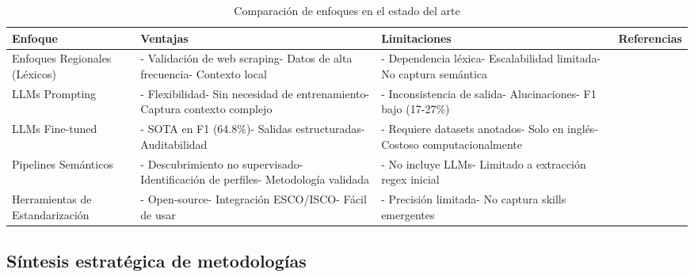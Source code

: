 \begin{table}[H]
\centering
\caption{Comparación de enfoques en el estado del arte}
\label{tab:estado-arte-comparativo}
\begin{tabular}{|p{3cm}|p{4cm}|p{4cm}|p{3cm}|}
\hline
\textbf{Enfoque} & \textbf{Ventajas} & \textbf{Limitaciones} & \textbf{Referencias} \\
\hline
Enfoques Regionales (Léxicos) & - Validación de web scraping\newline - Datos de alta frecuencia\newline - Contexto local & - Dependencia léxica\newline - Escalabilidad limitada\newline - No captura semántica & \cite{rubio2024, aguilera2018, martinez2024} \\
\hline
LLMs Prompting & - Flexibilidad\newline - Sin necesidad de entrenamiento\newline - Captura contexto complejo & - Inconsistencia de salida\newline - Alucinaciones\newline - F1 bajo (17-27\%) & \cite{nguyen2024} \\
\hline
LLMs Fine-tuned & - SOTA en F1 (64.8\%)\newline - Salidas estructuradas\newline - Auditabilidad & - Requiere datasets anotados\newline - Solo en inglés\newline - Costoso computacionalmente & \cite{herandi2024, zhang2022} \\
\hline
Pipelines Semánticos & - Descubrimiento no supervisado\newline - Identificación de perfiles\newline - Metodología validada & - No incluye LLMs\newline - Limitado a extracción regex inicial & \cite{lukauskas2023} \\
\hline
Herramientas de Estandarización & - Open-source\newline - Integración ESCO/ISCO\newline - Fácil de usar & - Precisión limitada\newline - No captura skills emergentes & \cite{kavargyris2025} \\
\hline
\end{tabular}
\end{table}

\subsection{Síntesis estratégica de metodologías}

